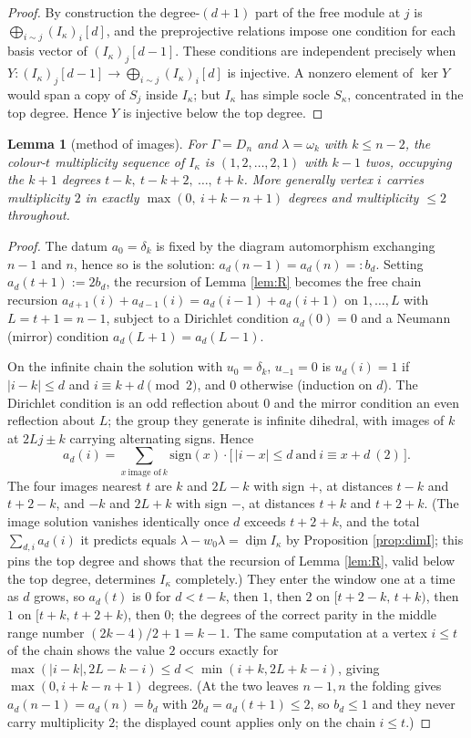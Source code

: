 \documentclass[11pt,reqno]{amsart}
\theoremstyle{plain}
\newtheorem{lemma}[theorem]{Lemma}
\theoremstyle{definition}
\newcommand{\dimv}{\underline{\dim}}
\newcommand{\om}{\omega}
\newcommand{\la}{\lambda}
\newcommand{\ka}{\kappa}
\begin{document}
\begin{proof}
By construction the degree-$(d+1)$ part of the free module at $j$ is
$\bigoplus_{i\sim j}(I_\ka)_i[d]$, and the preprojective relations impose one
condition for each basis vector of $(I_\ka)_j[d-1]$.  These conditions are
independent precisely when
$Y:(I_\ka)_j[d-1]\to\bigoplus_{i\sim j}(I_\ka)_i[d]$ is injective.  A nonzero
element of $\ker Y$ would span a copy of $S_j$ inside $I_\ka$; but $I_\ka$ has
simple socle $S_\ka$, concentrated in the top degree.  Hence $Y$ is injective
below the top degree.
\end{proof}

\begin{lemma}[method of images]\label{lem:P}
For $\Gamma=D_n$ and $\la=\om_k$ with $k\le n-2$, the colour-$t$ multiplicity
sequence of $I_\ka$ is $(1,2,\dots,2,1)$ with $k-1$ twos, occupying the $k+1$
degrees $t-k,\ t-k+2,\ \dots,\ t+k$.  More generally vertex $i$ carries
multiplicity $2$ in exactly $\max(0,\ i+k-n+1)$ degrees and multiplicity
$\le2$ throughout.
\end{lemma}

\begin{proof}
The datum $a_0=\delta_k$ is fixed by the diagram automorphism exchanging $n-1$
and $n$, hence so is the solution: $a_d(n-1)=a_d(n)=:b_d$.  Setting
$a_d(t+1):=2b_d$, the recursion of Lemma \ref{lem:R} becomes the free chain
recursion $a_{d+1}(i)+a_{d-1}(i)=a_d(i-1)+a_d(i+1)$ on $1,\dots,L$ with
$L=t+1=n-1$, subject to a Dirichlet condition $a_d(0)=0$ and a Neumann
(mirror) condition $a_d(L+1)=a_d(L-1)$.

On the infinite chain the solution with $u_0=\delta_k$, $u_{-1}=0$ is
$u_d(i)=1$ if $|i-k|\le d$ and $i\equiv k+d \pmod 2$, and $0$ otherwise
(induction on $d$).  The Dirichlet condition is an odd reflection about $0$ and
the mirror condition an even reflection about $L$; the group they generate is
infinite dihedral, with images of $k$ at $2Lj\pm k$ carrying alternating signs.
Hence
\[
   a_d(i)=\sum_{x\ \text{image of}\ k}
      \mathrm{sign}(x)\cdot\bigl[\,|i-x|\le d\ \text{and}\ i\equiv x+d\ (2)\,\bigr].
\]
The four images nearest $t$ are $k$ and $2L-k$ with sign $+$, at distances
$t-k$ and $t+2-k$, and $-k$ and $2L+k$ with sign $-$, at distances $t+k$ and
$t+2+k$.  (The image solution vanishes identically once $d$ exceeds $t+2+k$, and the
total $\sum_{d,i}a_d(i)$ it predicts equals $\la-w_0\la=\dimv I_\ka$ by
Proposition \ref{prop:dimI}; this pins the top degree and shows that the
recursion of Lemma \ref{lem:R}, valid below the top degree, determines
$I_\ka$ completely.)  They enter the window one at a time as $d$ grows, so
$a_d(t)$ is $0$
for $d<t-k$, then $1$, then $2$ on $[t+2-k,\,t+k)$, then $1$ on
$[t+k,\,t+2+k)$, then $0$; the degrees of the correct parity in the middle
range number $(2k-4)/2+1=k-1$.  The same computation at a vertex $i\le t$ of the
chain shows the value $2$ occurs exactly for
$\max(|i-k|,2L-k-i)\le d<\min(i+k,2L+k-i)$, giving $\max(0,i+k-n+1)$ degrees.
(At the two leaves $n-1,n$ the folding gives $a_d(n-1)=a_d(n)=b_d$ with
$2b_d=a_d(t+1)\le2$, so $b_d\le1$ and they never carry multiplicity $2$; the
displayed count applies only on the chain $i\le t$.)
\end{proof}
\end{document}

